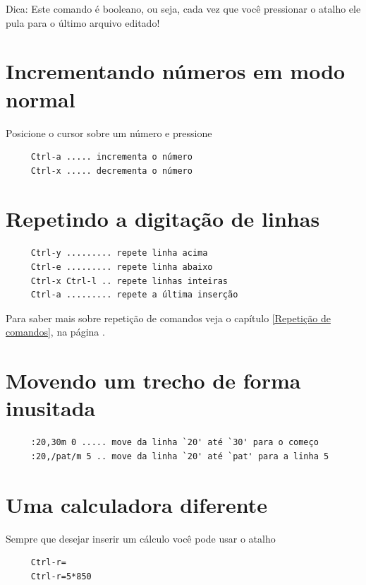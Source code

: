 \documentclass[10pt,a4paper,openany]{book}
\begin{document}
Dica: Este comando é booleano, ou seja, cada vez que você pressionar o atalho
ele pula para o último arquivo editado!


\section{Incrementando números em modo normal}\label{Incrementando números em modo normal}
Posicione o cursor sobre um número e pressione

\begin{verbatim}
     Ctrl-a ..... incrementa o número
     Ctrl-x ..... decrementa o número
\end{verbatim}

\section{Repetindo a digitação de linhas}
\label{Repetindo a digitação de linhas}

\begin{verbatim}
     Ctrl-y ......... repete linha acima
     Ctrl-e ......... repete linha abaixo
     Ctrl-x Ctrl-l .. repete linhas inteiras
     Ctrl-a ......... repete a última inserção
\end{verbatim}

Para saber mais sobre repetição de comandos veja o capítulo \ref{Repetição de comandos},
na página \pageref{Repetição de comandos}.

\section{Movendo um trecho de forma inusitada}
\label{Movendo um trecho de forma inusitada}

\begin{verbatim}
     :20,30m 0 ..... move da linha `20' até `30' para o começo
     :20,/pat/m 5 .. move da linha `20' até `pat' para a linha 5
\end{verbatim}


\section{Uma calculadora diferente}
\label{Uma calculadora diferente}
Sempre que desejar inserir um cálculo você pode usar o atalho

\begin{verbatim}
     Ctrl-r=
     Ctrl-r=5*850
\end{verbatim}
\end{document}
